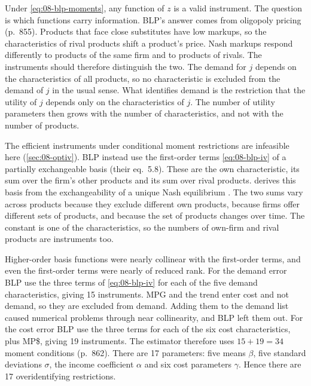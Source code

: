 Under \eqref{eq:08-blp-moments}, any function of $z$ is a valid instrument. The question is which
functions carry information. BLP's answer comes from oligopoly pricing (p.~855). Products that face
close substitutes have low markups, so the characteristics of rival products shift a product's price.
Nash markups respond differently to products of the same firm and to products of rivals. The
instruments should therefore distinguish the two. The demand for $j$ depends on the characteristics of
all products, so no characteristic is excluded from the demand of $j$ in the usual sense. What
identifies demand is the restriction that the utility of $j$ depends only on the characteristics of
$j$. The number of utility parameters then grows with the number of characteristics, and not with the
number of products.

The efficient instruments under conditional moment restrictions are infeasible here
(\cref{sec:08-optiv}). BLP instead use the first-order terms \eqref{eq:08-blp-iv} of a partially
exchangeable basis (their eq.~5.8). These are the own characteristic, its sum over the firm's other products
and its sum over rival products.  derives this basis from the exchangeability of a
unique Nash equilibrium \citep{Pakes1994}. The two sums vary across products because they exclude different
own products, because firms offer different sets of products, and because the set of products changes over
time. The constant is one of the characteristics, so the numbers of own-firm and rival products are
instruments too.

Higher-order basis functions were nearly collinear with the first-order terms, and even the first-order
terms were nearly of reduced rank. For the demand error BLP use the three terms of
\eqref{eq:08-blp-iv} for each of the five demand characteristics, giving 15 instruments. MPG and the
trend enter cost and not demand, so they are excluded from demand. Adding them to the demand list caused
numerical problems through near collinearity, and BLP left them out. For the cost error BLP use the three terms for each of the six cost characteristics,
plus MP\$, giving 19 instruments. The estimator therefore uses $15+19=34$ moment conditions (p.~862).
There are 17 parameters: five means $\beta$, five standard deviations $\sigma$, the income coefficient
$\alpha$ and six cost parameters $\gamma$. Hence there are 17 overidentifying restrictions.

